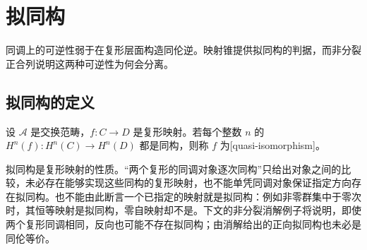 
\section{拟同构}
\label{b4:sec:0603}

同调上的可逆性弱于在复形层面构造同伦逆。映射锥提供拟同构的判据，而非分裂正合列说明这两种可逆性为何会分离。

%
%

\subsection{拟同构的定义}
\label{b4:subsec:0603:01}

\begin{definition}\label{b4:def:quasi-isomorphism}
	设 \(\mathcal A\) 是交换范畴，\(f:C\to D\) 是复形映射。若每个整数 \(n\) 的 \(H^n(f):H^n(C)\to H^n(D)\) 都是同构，则称 \(f\) 为[quasi-isomorphism]。
\end{definition}

拟同构是复形映射的性质。“两个复形的同调对象逐次同构”只给出对象之间的比较，未必存在能够实现这些同构的复形映射，也不能单凭同调对象保证指定方向存在拟同构。也不能由此断言一个已指定的映射就是拟同构：例如非零群集中于零次时，其恒等映射是拟同构，零自映射却不是。下文的非分裂消解例子将说明，即使两个复形同调相同，反向也可能不存在拟同构；由消解给出的正向拟同构也未必是同伦等价。

